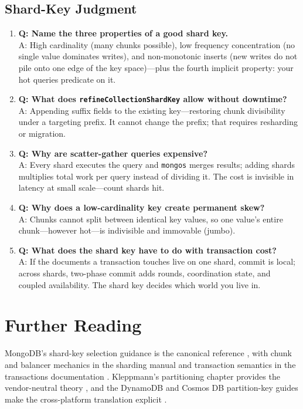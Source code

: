 \subsection{Shard-Key Judgment}
\begin{enumerate}
    \item \textbf{Q: Name the three properties of a good shard key.}\\
    A: High cardinality (many chunks possible), low frequency concentration (no single value dominates writes), and non-monotonic inserts (new writes do not pile onto one edge of the key space)---plus the fourth implicit property: your hot queries predicate on it.

    \item \textbf{Q: What does \texttt{refineCollectionShardKey} allow without downtime?}\\
    A: Appending suffix fields to the existing key---restoring chunk divisibility under a targeting prefix. It cannot change the prefix; that requires resharding or migration.

    \item \textbf{Q: Why are scatter-gather queries expensive?}\\
    A: Every shard executes the query and \texttt{mongos} merges results; adding shards multiplies total work per query instead of dividing it. The cost is invisible in latency at small scale---count shards hit.

    \item \textbf{Q: Why does a low-cardinality key create permanent skew?}\\
    A: Chunks cannot split between identical key values, so one value's entire chunk---however hot---is indivisible and immovable (jumbo).

    \item \textbf{Q: What does the shard key have to do with transaction cost?}\\
    A: If the documents a transaction touches live on one shard, commit is local; across shards, two-phase commit adds rounds, coordination state, and coupled availability. The shard key decides which world you live in.
\end{enumerate}

\section{Further Reading}
MongoDB's shard-key selection guidance is the canonical reference \cite{mongodbShardKeyDocs}, with chunk and balancer mechanics in the sharding manual \cite{mongodbShardingDocs} and transaction semantics in the transactions documentation \cite{mongodbTransactionsDocs}. Kleppmann's partitioning chapter provides the vendor-neutral theory \cite{kleppmann2017ddia}, and the DynamoDB and Cosmos DB partition-key guides make the cross-platform translation explicit \cite{dynamodbSingleTableDocs,cosmosPartitionDocs}.

